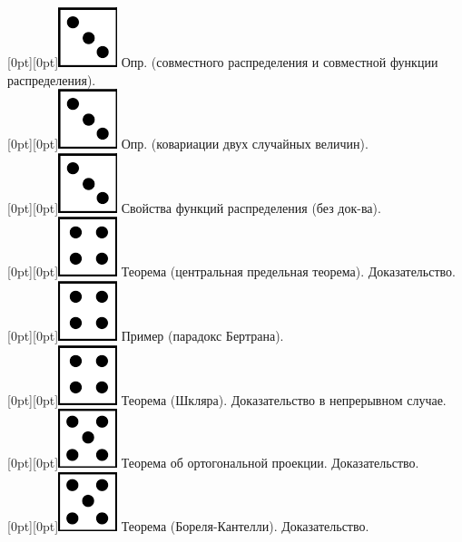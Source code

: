 \documentclass[10pt]{article}
\begin{document}
\raisebox{-1pt}[0pt][0pt]{\includegraphics[width=0.02\linewidth]{3.png}} Опр. (совместного распределения и  совместной функции распределения). \\

\raisebox{-1pt}[0pt][0pt]{\includegraphics[width=0.02\linewidth]{3.png}} Опр. (ковариации двух случайных величин). \\

\raisebox{-1pt}[0pt][0pt]{\includegraphics[width=0.02\linewidth]{3.png}} Свойства функций распределения (без док-ва). \\

\raisebox{-1pt}[0pt][0pt]{\includegraphics[width=0.02\linewidth]{4.png}} Теорема (центральная предельная теорема). Доказательство. \\        

\raisebox{-1pt}[0pt][0pt]{\includegraphics[width=0.02\linewidth]{4.png}} Пример (парадокс Бертрана). \\ 

\raisebox{-1pt}[0pt][0pt]{\includegraphics[width=0.02\linewidth]{4.png}} Теорема (Шкляра). Доказательство в непрерывном случае. \\

\raisebox{-1pt}[0pt][0pt]{\includegraphics[width=0.02\linewidth]{5.png}} Теорема об ортогональной проекции. Доказательство. \\

\raisebox{-1pt}[0pt][0pt]{\includegraphics[width=0.02\linewidth]{5.png}} Теорема (Бореля-Кантелли). Доказательство. \\
\end{document}
